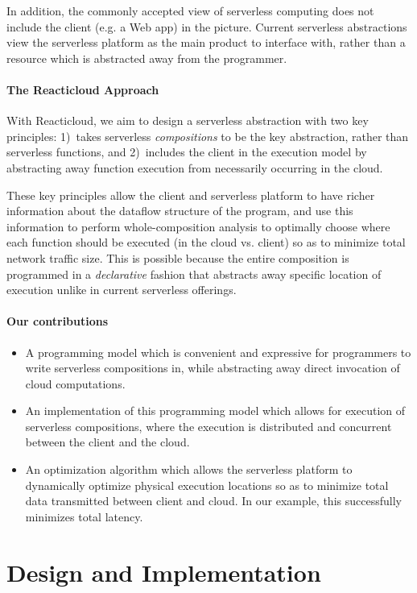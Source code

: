 \documentclass[10pt,sigplan,screen,nonacm]{acmart}
\begin{document}
In addition, the commonly accepted view of serverless computing
does not include the client (e.g. a Web app) in the picture.
Current serverless abstractions view the serverless platform
as the main product to interface with, rather than a
resource which is abstracted away from the programmer.

\paragraph{The Reacticloud Approach}
With Reacticloud, we aim to design a serverless abstraction
with two key principles: 
1)~takes serverless \emph{compositions} to be the key abstraction,
rather than serverless functions, and 
2)~includes the client in the execution model
by abstracting away function execution from necessarily
occurring in the cloud.

These key principles allow the client and
serverless platform to have richer information
about the dataflow structure of the program,
and use this information to perform whole-composition
analysis to optimally choose
where each function should be executed
(in the cloud vs. client)
so as to minimize total network traffic size.
This is possible because the entire composition is
programmed in a \emph{declarative} fashion that
abstracts away specific location of execution unlike
in current serverless offerings.

\paragraph{Our contributions}
\begin{itemize}
  \item A programming model which is convenient and expressive
    for programmers to write serverless compositions in,
		while abstracting away direct invocation of cloud
		computations.
  \item An implementation of this programming model which allows
		for execution of serverless compositions, where the execution
		is distributed and concurrent between the client and the cloud.
  \item An optimization algorithm which allows the serverless
    platform to dynamically optimize physical execution locations
		so as to minimize total data transmitted between client and cloud.
		In our example, this successfully minimizes total latency.
\end{itemize}


\section{Design and Implementation}
\end{document}
